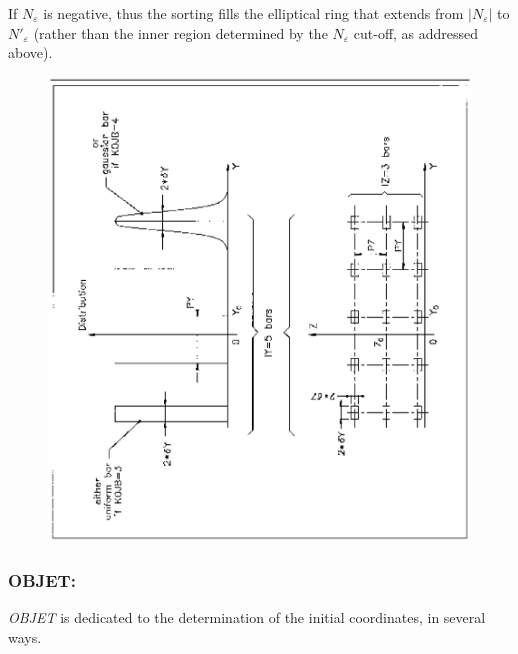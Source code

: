 \noindent If $N_\varepsilon$ is negative, thus the sorting fills the 
elliptical ring that extends from $\left| N_\varepsilon \right|$ to 
$N'_\varepsilon$ (rather than the inner region determined by the $N_\varepsilon$ 
cut-off, as addressed above).
\newpage
\vfill
 \begin{figure}[H]
\centerline{\includegraphics[width=15cm,angle=-90]{Fig5.ps}}  %
 \end{figure}
 \vfill 

\newpage

 
\subsubsection*{OBJET:   \OBJETTitl} \label{OBJET} 

\textsl{OBJET} is dedicated to the determination of the initial
coordinates, in several ways.  
\medskip

